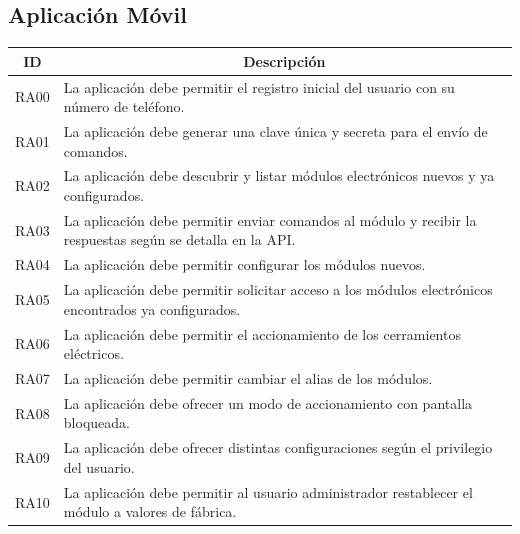 \subsection{Aplicación Móvil}
\begin{table}[ht]
	\begin{tabular}{|l|m{12cm}|}
		\hline
		\multicolumn{1}{|c|}{\textbf{ID}} & \multicolumn{1}{c|}{\textbf{Descripción}}                                                                 \\ \hline
		RA00                              & La aplicación debe permitir el registro inicial del usuario con su número de teléfono.                    \\ \hline
		RA01                              & La aplicación debe generar una clave única y secreta para el envío de comandos.                           \\ \hline
		RA02                              & La aplicación debe descubrir y listar módulos electrónicos nuevos y ya configurados.                      \\ \hline
		RA03                              & La aplicación debe permitir enviar comandos al módulo y recibir la respuestas según se detalla en la API. \\ \hline
		RA04                              & La aplicación debe permitir configurar los módulos nuevos.                                                \\ \hline
		RA05                              & La aplicación debe permitir solicitar acceso a los módulos electrónicos encontrados ya configurados.      \\ \hline
		RA06                              & La aplicación debe permitir el accionamiento de los cerramientos eléctricos.                              \\ \hline
		RA07                              & La aplicación debe permitir cambiar el alias de los módulos.                                              \\ \hline
		RA08                              & La aplicación debe ofrecer un modo de accionamiento con pantalla bloqueada.                               \\ \hline
		RA09                              & La aplicación debe ofrecer distintas configuraciones según el privilegio del usuario.                     \\ \hline
		RA10                              & La aplicación debe permitir al usuario administrador restablecer el módulo a valores de fábrica.          \\ \hline

\end{tabular}
\end{table}

